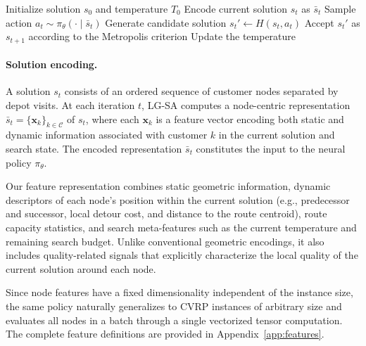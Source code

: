 \documentclass[letterpaper]{article} %
\begin{document}
\begin{algorithm}[h!]
\caption{LG-SA}
\label{alg:lgsa}
\footnotesize
\begin{algorithmic}[1]
\STATE Initialize solution $s_0$ and temperature $T_0$
    \STATE Encode current solution $s_t$ as $\bar s_t$
    \STATE Sample action $a_t \sim \pi_\theta(\cdot\mid \bar s_t)$
    \STATE Generate candidate solution $s_t' \gets H(s_t, a_t)$
    \STATE Accept $s_t'$ as $s_{t+1}$ according to the Metropolis criterion
    \STATE Update the temperature
\ENDFOR
\end{algorithmic}
\end{algorithm}


\paragraph{Solution encoding.}
A solution $s_t$ consists of an ordered sequence of customer nodes separated by depot visits. At each iteration $t$, LG-SA computes a node-centric representation
$\bar{s}_t = \{ \mathbf{x}_k \}_{k \in \mathcal C}$ of $s_t$,
where each $\mathbf{x}_k$ is a feature vector encoding both static and dynamic information associated with customer $k$ in the current solution and search state. The encoded representation $\bar{s}_t$ constitutes the input to the neural policy $\pi_\theta$.

Our feature representation combines static geometric information, dynamic descriptors of each node's position within the current solution (e.g., predecessor and successor, local detour cost, and distance to the route centroid), route capacity statistics, and search meta-features such as the current temperature and remaining search budget. Unlike conventional geometric encodings, it also includes quality-related signals that explicitly characterize the local quality of the current solution around each node.


Since node features have a fixed dimensionality independent of the instance size, the same policy naturally generalizes to CVRP instances of arbitrary size and evaluates all nodes in a batch through a single vectorized tensor computation. The complete feature definitions are provided in Appendix~\ref{app:features}.


\end{document}
